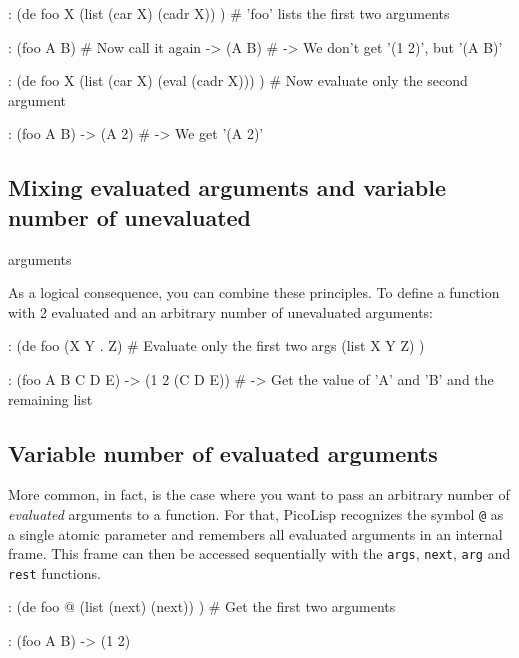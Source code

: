 \begin{wideverbatim}
: (de foo X
   (list (car X) (cadr X)) )        # 'foo' lists the first two arguments

: (foo A B)                         # Now call it again
-> (A B)                            # -> We don't get '(1 2)', but '(A B)'

: (de foo X
   (list (car X) (eval (cadr X))) ) # Now evaluate only the second argument

: (foo A B)
-> (A 2)                            # -> We get '(A 2)'
\end{wideverbatim}

 
\subsection{Mixing evaluated arguments and variable number of unevaluated}
\label{sec:tut-mixing-evaluated-arguments-and-variable-number-of-unevaluated}

arguments

As a logical consequence, you can combine these principles. To define a
function with 2 evaluated and an arbitrary number of unevaluated
arguments:


\begin{wideverbatim}
: (de foo (X Y . Z)     # Evaluate only the first two args
   (list X Y Z) )

: (foo A B C D E)
-> (1 2 (C D E))        # -> Get the value of 'A' and 'B' and the remaining list
\end{wideverbatim}

 
\subsection{Variable number of evaluated arguments}
\label{sec:tut-variable-number-of-evaluated-arguments}


More common, in fact, is the case where you want to pass an arbitrary
number of \emph{evaluated} arguments to a function. For that, PicoLisp
recognizes the symbol \texttt{@} as a single atomic parameter and remembers all
evaluated arguments in an internal frame. This frame can then be
accessed sequentially with the \texttt{args}, \texttt{next}, \texttt{arg} and \texttt{rest}
functions.


\begin{wideverbatim}
: (de foo @
   (list (next) (next)) )     # Get the first two arguments

: (foo A B)
-> (1 2)
\end{wideverbatim}

